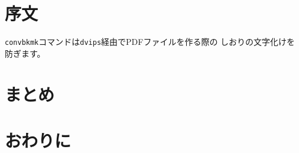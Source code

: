 \documentclass{jarticle}
\begin{document}
\section{序文}
\texttt{convbkmk}コマンドは\texttt{dvips}経由でPDFファイルを作る際の
しおりの文字化けを防ぎます。
\section{まとめ}
\section{おわりに}
\end{document}
